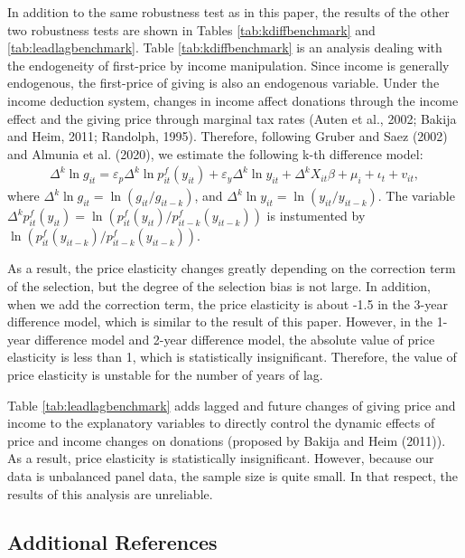 \documentclass[
  11pt,
  a4paper,
]{article}
\begin{document}
In addition to the same robustness test as in this paper,
the results of the other two robustness tests
are shown in Tables \ref{tab:kdiffbenchmark} and \ref{tab:leadlagbenchmark}.
Table \ref{tab:kdiffbenchmark} is an analysis dealing with
the endogeneity of first-price by income manipulation.
Since income is generally endogenous,
the first-price of giving is also an endogenous variable.
Under the income deduction system,
changes in income affect donations through the income effect
and the giving price through marginal tax rates
(Auten et al., 2002; Bakija and Heim, 2011; Randolph, 1995).
Therefore, following Gruber and Saez (2002) and Almunia et al. (2020),
we estimate the following k-th difference model:
\begin{align}
  \Delta^k \ln g_{it} = \varepsilon_p \Delta^k \ln p^f_{it}(y_{it})
  + \varepsilon_y \Delta^k \ln y_{it} + \Delta^k X_{it} \beta
  + \mu_i + \iota_t + v_{it},
\end{align}
where \(\Delta^k \ln g_{it} = \ln (g_{it} / g_{it-k})\),
and \(\Delta^k \ln y_{it} = \ln (y_{it} / y_{it-k})\).
The variable
\(\Delta^k p^f_{it}(y_{it}) = \ln (p^f_{it}(y_{it}) / p^f_{it-k}(y_{it-k}))\)
is instumented by \(\ln (p^f_{it}(y_{it-k})/p^f_{it-k}(y_{it-k}))\).

As a result,
the price elasticity changes greatly
depending on the correction term of the selection,
but the degree of the selection bias is not large.
In addition, when we add the correction term,
the price elasticity is about -1.5 in the 3-year difference model,
which is similar to the result of this paper.
However, in the 1-year difference model and 2-year difference model,
the absolute value of price elasticity is less than 1,
which is statistically insignificant.
Therefore, the value of price elasticity is unstable
for the number of years of lag.

Table \ref{tab:leadlagbenchmark} adds
lagged and future changes of giving price and income
to the explanatory variables
to directly control the dynamic effects of
price and income changes on donations (proposed by Bakija and Heim (2011)).
As a result, price elasticity is statistically insignificant.
However, because our data is unbalanced panel data,
the sample size is quite small.
In that respect, the results of this analysis are unreliable.

\hypertarget{additional-references}{%
\subsection*{Additional References}\label{additional-references}}
\end{document}
